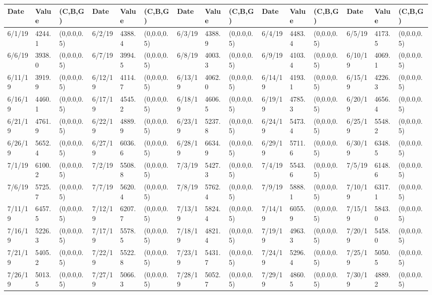 \documentclass[12pt]{article}
\begin{document}
        \begin{table}
            \tiny
            \begin{center}
            \begin{tabular}{p{15pt}p{15pt}p{25pt}p{15pt}p{15pt}p{25pt}p{15pt}p{15pt}p{25pt}p{15pt}p{15pt}p{25pt}p{15pt}p{15pt}p{25pt}}
            \toprule
            Date & Value&(C,B,G)&Date & Value&(C,B,G)&Date & Value&(C,B,G)&Date & Value&(C,B,G)&Date & Value&(C,B,G)\\
            \midrule
            6/1/19&4244.1&(0,0.0,0.5)&6/2/19&4388.4&(0,0.0,0.5)&6/3/19&4388.9&(0,0.0,0.5)&6/4/19&4483.4&(0,0.0,0.5)&6/5/19&4173.5&(0,0.0,0.5)\\
            6/6/19&3938.0&(0,0.0,0.5)&6/7/19&3994.5&(0,0.0,0.5)&6/8/19&4003.3&(0,0.0,0.5)&6/9/19&4103.4&(0,0.0,0.5)&6/10/19&4069.1&(0,0.0,0.5)\\
            6/11/19&3919.9&(0,0.0,0.5)&6/12/19&4114.7&(0,0.0,0.5)&6/13/19&4062.0&(0,0.0,0.5)&6/14/19&4193.1&(0,0.0,0.5)&6/15/19&4226.3&(0,0.0,0.5)\\
            6/16/19&4460.1&(0,0.0,0.5)&6/17/19&4545.2&(0,0.0,0.5)&6/18/19&4606.5&(0,0.0,0.5)&6/19/19&4785.3&(0,0.0,0.5)&6/20/19&4656.4&(0,0.0,0.5)\\
            6/21/19&4761.9&(0,0.0,0.5)&6/22/19&4889.9&(0,0.0,0.5)&6/23/19&5237.8&(0,0.0,0.5)&6/24/19&5473.4&(0,0.0,0.5)&6/25/19&5548.2&(0,0.0,0.5)\\
            6/26/19&5652.4&(0,0.0,0.5)&6/27/19&6036.6&(0,0.0,0.5)&6/28/19&6634.9&(0,0.0,0.5)&6/29/19&5711.6&(0,0.0,0.5)&6/30/19&6348.5&(0,0.0,0.5)\\
            7/1/19&6100.2&(0,0.0,0.5)&7/2/19&5508.8&(0,0.0,0.5)&7/3/19&5427.3&(0,0.0,0.5)&7/4/19&5543.6&(0,0.0,0.5)&7/5/19&6148.6&(0,0.0,0.5)\\
            7/6/19&5725.7&(0,0.0,0.5)&7/7/19&5620.4&(0,0.0,0.5)&7/8/19&5762.4&(0,0.0,0.5)&7/9/19&5888.1&(0,0.0,0.5)&7/10/19&6317.1&(0,0.0,0.5)\\
            7/11/19&6457.5&(0,0.0,0.5)&7/12/19&6207.7&(0,0.0,0.5)&7/13/19&5824.4&(0,0.0,0.5)&7/14/19&6055.9&(0,0.0,0.5)&7/15/19&5843.0&(0,0.0,0.5)\\
            7/16/19&5226.3&(0,0.0,0.5)&7/17/19&5578.5&(0,0.0,0.5)&7/18/19&4821.4&(0,0.0,0.5)&7/19/19&4963.3&(0,0.0,0.5)&7/20/19&5458.0&(0,0.0,0.5)\\
            7/21/19&5405.2&(0,0.0,0.5)&7/22/19&5522.8&(0,0.0,0.5)&7/23/19&5431.7&(0,0.0,0.5)&7/24/19&5296.4&(0,0.0,0.5)&7/25/19&5050.5&(0,0.0,0.5)\\
            7/26/19&5013.5&(0,0.0,0.5)&7/27/19&5066.3&(0,0.0,0.5)&7/28/19&5052.7&(0,0.0,0.5)&7/29/19&4860.5&(0,0.0,0.5)&7/30/19&4889.2&(0,0.0,0.5)\\

\end{tabular}
\end{center}
\end{table}
\end{document}
